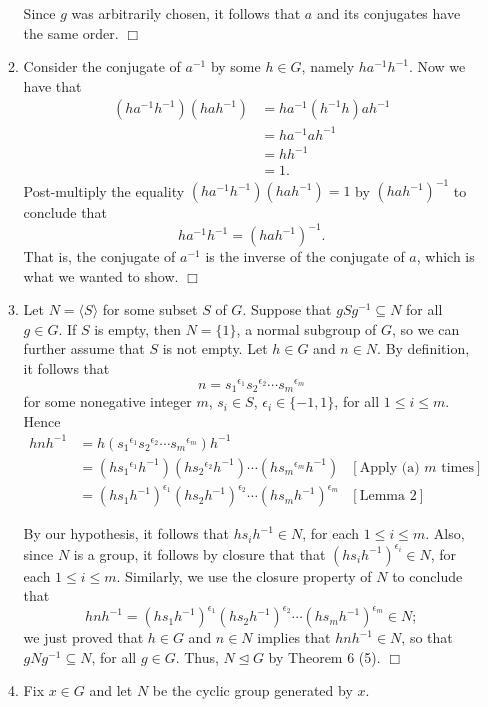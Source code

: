 \documentclass[9pt]{article}
\newcommand{\qed}{\hfill \ensuremath{\Box}}
\newcommand{\cyc}[1]{\langle #1 \rangle}
\begin{document}
\begin{enumerate}
\begin{enumerate}
            Since $g$ was arbitrarily chosen, it follows that $a$ and its
            conjugates have the same order. \qed
      \item Consider the conjugate of $a^{-1}$ by some $h \in G$, namely
            $ha^{-1}h^{-1}$. Now we have that
            \begin{align*}
               (ha^{-1}h^{-1})(hah^{-1}) &= ha^{-1}(h^{-1}h)ah^{-1} \\
                  &= ha^{-1}ah^{-1} \\
                  &= hh^{-1} \\
                  &= 1.
            \end{align*}
            Post-multiply the equality $(ha^{-1}h^{-1})(hah^{-1}) = 1$ by
            $(hah^{-1})^{-1}$ to conclude that
            $$ha^{-1}h^{-1} = (hah^{-1})^{-1}.$$
            That is, the conjugate of $a^{-1}$ is the inverse of the conjugate 
            of $a$, which is what we wanted to show. \qed
      \item Let $N = \cyc{S}$ for some subset $S$ of $G$. Suppose that
            $gSg^{-1} \subseteq N$ for all $g \in G$. If $S$ is empty, then
            $N = \{1\}$, a normal subgroup of $G$, so we can further assume that
            $S$ is not empty. Let $h \in G$ and $n \in N$. By definition, it
            follows that
            $$n = {s_1}^{\epsilon_1}{s_2}^{\epsilon_2}\cdots{s_m}^{\epsilon_m}$$
            for some nonegative integer $m$, $s_i \in S$,
            $\epsilon_i \in \{-1, 1\}$, for all $1 \le i \le m$. Hence
            \begin{align*}
               hnh^{-1} &= h({s_1}^{\epsilon_1}{s_2}^{\epsilon_2}
                  \cdots{s_m}^{\epsilon_m})h^{-1} \\
                  &= (h{s_1}^{\epsilon_1}h^{-1})(h{s_2}^{\epsilon_2}h^{-1})
                  \cdots(h{s_m}^{\epsilon_m}h^{-1}) &[\text{Apply (a) $m$ times}]\\
                  &= (hs_1h^{-1})^{\epsilon_1}(hs_2h^{-1})^{\epsilon_2}
                  \cdots(hs_mh^{-1})^{\epsilon_m} &[\text{Lemma 2}]
            \end{align*}

            By our hypothesis, it follows that $hs_ih^{-1} \in N$, for each
            $1 \le i \le m$. Also, since $N$ is a group, it follows by closure
            that that $(hs_ih^{-1})^{\epsilon_i} \in N$, for each
            $1 \le i \le m$. Similarly, we use the closure property of $N$ to
            conclude that
            $$hnh^{-1} = (hs_1h^{-1})^{\epsilon_1}(hs_2h^{-1})^{\epsilon_2}
              \cdots(hs_mh^{-1})^{\epsilon_m} \in N;$$
            we just proved that $h \in G$ and $n \in N$ implies that
            $hnh^{-1} \in N$, so that $gNg^{-1} \subseteq N$, for all $g \in G$.
            Thus, $N \trianglelefteq G$ by Theorem 6 (5). \qed
      \item Fix $x \in G$ and let $N$ be the cyclic group generated by $x$.


\end{enumerate}
\end{enumerate}
\end{document}
